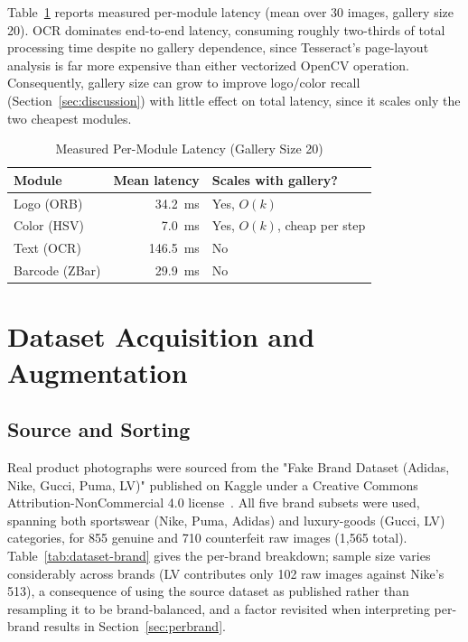 \documentclass[conference]{IEEEtran}
\begin{document}
Table~\ref{tab:timing} reports measured per-module latency (mean over 30
images, gallery size 20). OCR dominates end-to-end latency, consuming
roughly two-thirds of total processing time despite no gallery
dependence, since Tesseract's page-layout analysis is far more
expensive than either vectorized OpenCV operation. Consequently,
gallery size can grow to improve logo/color recall
(Section~\ref{sec:discussion}) with little effect on total latency,
since it scales only the two cheapest modules.

\begin{table}[t]
\caption{Measured Per-Module Latency (Gallery Size 20)}
\label{tab:timing}
\centering
\begin{tabular}{lrl}
\toprule
Module & Mean latency & Scales with gallery? \\
\midrule
Logo (ORB)      & 34.2~ms & Yes, $O(k)$ \\
Color (HSV)     & 7.0~ms  & Yes, $O(k)$, cheap per step \\
Text (OCR)      & 146.5~ms & No \\
Barcode (ZBar)  & 29.9~ms & No \\
\bottomrule
\end{tabular}
\end{table}

\section{Dataset Acquisition and Augmentation}
\label{sec:dataset}

\subsection{Source and Sorting}

Real product photographs were sourced from the "Fake Brand Dataset
(Adidas, Nike, Gucci, Puma, LV)" published on Kaggle under a Creative
Commons Attribution-NonCommercial 4.0 license~\cite{kaggledata}. All five
brand subsets were used, spanning both sportswear (Nike, Puma, Adidas)
and luxury-goods (Gucci, LV) categories, for 855 genuine and 710
counterfeit raw images (1{,}565 total). Table~\ref{tab:dataset-brand}
gives the per-brand breakdown; sample size varies considerably across
brands (LV contributes only 102 raw images against Nike's 513), a
consequence of using the source dataset as published rather than
resampling it to be brand-balanced, and a factor revisited when
interpreting per-brand results in Section~\ref{sec:perbrand}.
\end{document}
